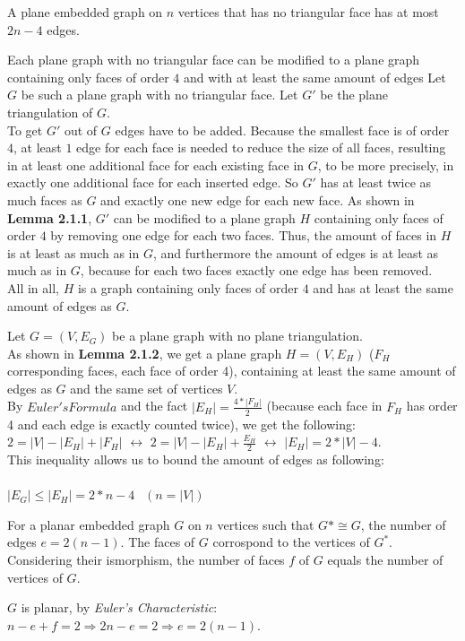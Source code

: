 \documentclass[a4paper]{article}
\begin{document}
\begin{solution}{19}
\begin{theorem} {A plane embedded graph on $n$ vertices that has no triangular face has at most $2n-4$ edges.}
			\begin{lemma} {Each plane graph with no triangular face can be modified to a plane graph containing only faces of order $4$  and with at least the same amount of edges}
				Let $G$ be such a plane graph with no triangular face. Let $G'$ be the plane triangulation of $G$.\\
				To get $G'$ out of $G$ edges have to be added. Because the smallest face is of order $4$, at least $1$ edge for each face is needed to reduce the size of all faces, resulting in at least one additional face for each existing face in $G$, to be more precisely, in exactly one additional face for each inserted edge. So $G'$ has at least twice as much faces as $G$ and exactly one new edge for each new face. As shown in \textbf{Lemma 2.1.1}, $G'$ can be modified to a plane graph $H$ containing only faces of order $4$ by removing one edge for each two faces. Thus, the amount of faces in $H$ is at least as much as in $G$, and furthermore the amount of edges is at least as much as in $G$, because for each two faces exactly one edge has been removed.\\
				All in all, $H$ is a graph containing only faces of order $4$ and has at least the same amount of edges as $G$.
			\end{lemma}		
			
	
			Let $G=(V,E_G)$ be a plane graph with no plane triangulation.\\
			As shown in \textbf{Lemma 2.1.2}, we get a plane graph $H=(V,E_H)$ ($F_H$ corresponding faces, each face of order 4), containing at least the same amount of edges as $G$ and the same set of vertices $V$.\\
			
			By $Euler's Formula$ and the fact $|E_H|= \frac{4 * |F_H|}{2}$ (because each face in $F_H$ has order 4 and each edge is exactly counted twice), we get the following:\\
			$2 = |V| - |E_H| +|F_H|$ $\leftrightarrow$ $2 = |V| - |E_H| + \frac{E_H}{2}$ $\leftrightarrow$ $|E_H| = 2 * |V| - 4$.\\
			This inequality allows us to bound the amount of edges as following:\\\\
			$|E_G| \leq |E_H| = 2 * n - 4$   $~~(n=|V|)$
			
		\end{theorem}
	\end{solution}
	\newpage
	\begin{solution}{20}
		\begin{theorem}{For a planar embedded graph $G$ on $n$ vertices such that $G* \cong G$, the number of edges $e = 2(n - 1)$.}
			The faces of $G$ corrospond to the vertices of $G^*$. Considering their ismorphism, the number of faces $f$ of $G$ equals the number of vertices of $G$.
			
			$G$ is planar, by \emph{Euler's Characteristic}: $n - e + f = 2 \Rightarrow 2n - e = 2 \Rightarrow e = 2(n-1)$.
		\end{theorem}
	\end{solution}
\end{document}
